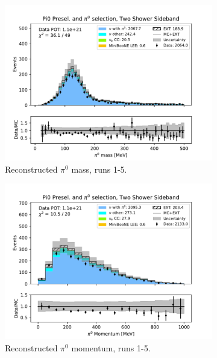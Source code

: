 \begin{figure}[H]
\begin{subfigure}{0.33\linewidth}
        \includegraphics[width=\linewidth]{technote/Sidebands/Figures/TwoShowerSideband/two_shr_sideband_pi0_mass_Y_corr_run1234b4c4d5_PI0_PI0.pdf}
        \caption{Reconstructed $\pi^0$ mass, runs 1-5.}
    \end{subfigure}%
    \begin{subfigure}{0.33\linewidth}
        \includegraphics[width=\linewidth]{technote/Sidebands/Figures/TwoShowerSideband/two_shr_sideband_pi0momentum_run1234b4c4d5_PI0_PI0.pdf}
        \caption{Reconstructed $\pi^0$ momentum, runs 1-5.}
    \end{subfigure}%
    \begin{subfigure}{0.33\linewidth}

\end{subfigure}
\end{figure}
